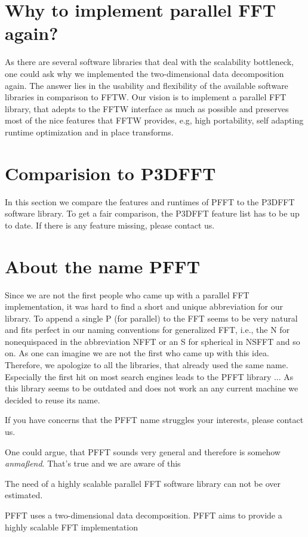 \section{Why to implement parallel FFT again?}
As there are several software libraries that deal with the scalability bottleneck, one could ask why we implemented the two-dimensional data decomposition again.
The answer lies in the usability and flexibility of the available software libraries in comparison to FFTW.
Our vision is to implement a parallel FFT library, that adepts to the FFTW interface as much as possible
and preserves most of the nice features that FFTW provides, e.g, high portability, self adapting runtime optimization and in place transforms.

\section{Comparision to P3DFFT}
In this section we compare the features and runtimes of PFFT to the P3DFFT software library.
To get a fair comparison, the P3DFFT feature list has to be up to date. If there is any feature missing, please contact us.

\section{About the name PFFT}
Since we are not the first people who came up with a parallel FFT implementation, it was hard
to find a short and unique abbreviation for our library. To append a single P (for parallel)
to the FFT seems to be very natural and fits perfect in our naming conventions for generalized
FFT, i.e., the N for nonequispaced in the abbreviation NFFT or an S for spherical in NSFFT and so on.
As one can imagine we are not the first who came up with this idea. Therefore, we apologize
to all the libraries, that already used the same name. Especially the first hit on most search engines
leads to the PFFT library ... As this library seems to be outdated and does not work an any current
machine we decided to reuse its name.

If you have concerns that the PFFT name struggles your interests, please contact us.


One could argue, that PFFT sounds very general and therefore is somehow \emph{anma\ss{}end}.
That's true and we are aware of this


The need of a highly scalable parallel FFT software library can not be over estimated. 

PFFT uses a two-dimensional data decomposition.
PFFT aims to provide a highly scalable FFT implementation

